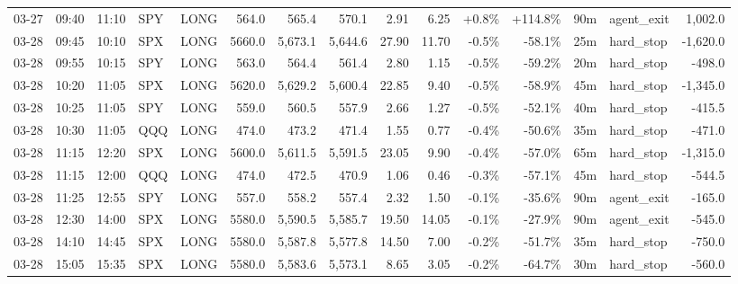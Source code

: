 \documentclass[11pt,a4paper,twoside]{article}
\begin{document}
\begin{landscape}
\begin{center}
\begin{longtable}{>{\color{txtmain}}l l l l l r r r r r r r r >{\color{txtmain}}l r}
03-27 & 09:40 & 11:10 & SPY & LONG & 564.0 & 565.4 & 570.1 & 2.91 & 6.25 & \textcolor{wingreen}{+0.8\%} & \textcolor{wingreen}{+114.8\%} & 90m & agent\_exit & \textcolor{wingreen}{1,002.0} \\
03-28 & 09:45 & 10:10 & SPX & LONG & 5660.0 & 5,673.1 & 5,644.6 & 27.90 & 11.70 & \textcolor{lossred}{-0.5\%} & \textcolor{lossred}{-58.1\%} & 25m & hard\_stop & \textcolor{lossred}{-1,620.0} \\
03-28 & 09:55 & 10:15 & SPY & LONG & 563.0 & 564.4 & 561.4 & 2.80 & 1.15 & \textcolor{lossred}{-0.5\%} & \textcolor{lossred}{-59.2\%} & 20m & hard\_stop & \textcolor{lossred}{-498.0} \\
03-28 & 10:20 & 11:05 & SPX & LONG & 5620.0 & 5,629.2 & 5,600.4 & 22.85 & 9.40 & \textcolor{lossred}{-0.5\%} & \textcolor{lossred}{-58.9\%} & 45m & hard\_stop & \textcolor{lossred}{-1,345.0} \\
03-28 & 10:25 & 11:05 & SPY & LONG & 559.0 & 560.5 & 557.9 & 2.66 & 1.27 & \textcolor{lossred}{-0.5\%} & \textcolor{lossred}{-52.1\%} & 40m & hard\_stop & \textcolor{lossred}{-415.5} \\
03-28 & 10:30 & 11:05 & QQQ & LONG & 474.0 & 473.2 & 471.4 & 1.55 & 0.77 & \textcolor{lossred}{-0.4\%} & \textcolor{lossred}{-50.6\%} & 35m & hard\_stop & \textcolor{lossred}{-471.0} \\
03-28 & 11:15 & 12:20 & SPX & LONG & 5600.0 & 5,611.5 & 5,591.5 & 23.05 & 9.90 & \textcolor{lossred}{-0.4\%} & \textcolor{lossred}{-57.0\%} & 65m & hard\_stop & \textcolor{lossred}{-1,315.0} \\
03-28 & 11:15 & 12:00 & QQQ & LONG & 474.0 & 472.5 & 470.9 & 1.06 & 0.46 & \textcolor{lossred}{-0.3\%} & \textcolor{lossred}{-57.1\%} & 45m & hard\_stop & \textcolor{lossred}{-544.5} \\
03-28 & 11:25 & 12:55 & SPY & LONG & 557.0 & 558.2 & 557.4 & 2.32 & 1.50 & \textcolor{lossred}{-0.1\%} & \textcolor{lossred}{-35.6\%} & 90m & agent\_exit & \textcolor{lossred}{-165.0} \\
03-28 & 12:30 & 14:00 & SPX & LONG & 5580.0 & 5,590.5 & 5,585.7 & 19.50 & 14.05 & \textcolor{lossred}{-0.1\%} & \textcolor{lossred}{-27.9\%} & 90m & agent\_exit & \textcolor{lossred}{-545.0} \\
03-28 & 14:10 & 14:45 & SPX & LONG & 5580.0 & 5,587.8 & 5,577.8 & 14.50 & 7.00 & \textcolor{lossred}{-0.2\%} & \textcolor{lossred}{-51.7\%} & 35m & hard\_stop & \textcolor{lossred}{-750.0} \\
03-28 & 15:05 & 15:35 & SPX & LONG & 5580.0 & 5,583.6 & 5,573.1 & 8.65 & 3.05 & \textcolor{lossred}{-0.2\%} & \textcolor{lossred}{-64.7\%} & 30m & hard\_stop & \textcolor{lossred}{-560.0} \\

\end{longtable}
\end{center}
\end{landscape}
\end{document}

